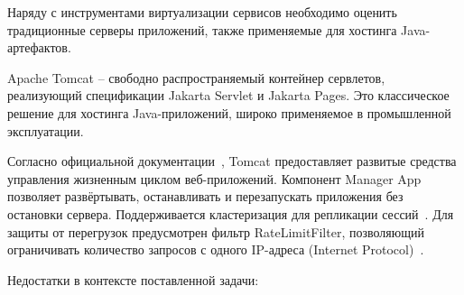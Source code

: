 Наряду с инструментами виртуализации сервисов необходимо оценить традиционные серверы приложений, также применяемые для хостинга Java-артефактов.


Apache Tomcat -- свободно распространяемый контейнер сервлетов, реализующий спецификации Jakarta Servlet и Jakarta Pages. Это классическое решение для хостинга Java-приложений, широко применяемое в промышленной эксплуатации.

Согласно официальной документации~\cite{tomcat}, Tomcat предоставляет развитые средства управления жизненным циклом веб-приложений. Компонент Manager App позволяет развёртывать, останавливать и перезапускать приложения без остановки сервера. Поддерживается кластеризация для репликации сессий~\cite{tomcat-cluster}. Для защиты от перегрузок предусмотрен фильтр RateLimitFilter, позволяющий ограничивать количество запросов с одного IP-адреса (Internet Protocol)~\cite{tomcat-ratelimit}.

Недостатки в контексте поставленной задачи:

